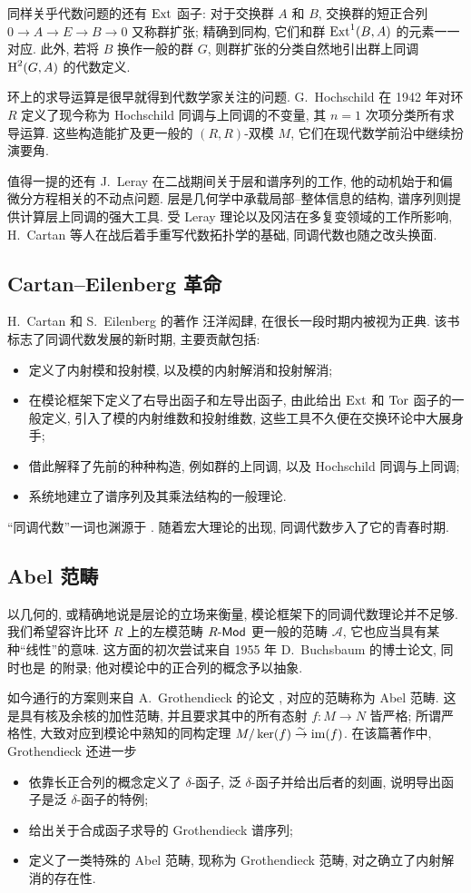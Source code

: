 同样关乎代数问题的还有 $\operatorname{Ext}$ 函子: 对于交换群 $A$ 和 $B$, 交换群的短正合列 $0 \to A \to E \to B \to 0$ 又称群扩张; 精确到同构, 它们和群 $\operatorname{Ext}^1(B, A)$ 的元素一一对应. 此外, 若将 $B$ 换作一般的群 $G$, 则群扩张的分类自然地引出群上同调 $\operatorname{H}^2(G, A)$ 的代数定义.

环上的求导运算是很早就得到代数学家关注的问题. G.\ Hochschild 在 1942 年对环 $R$ 定义了现今称为 Hochschild 同调与上同调的不变量, 其 $n=1$ 次项分类所有求导运算. 这些构造能扩及更一般的 $(R, R)$-双模 $M$, 它们在现代数学前沿中继续扮演要角.

值得一提的还有 J.\ Leray 在二战期间关于层和谱序列的工作, 他的动机始于和偏微分方程相关的不动点问题. 层是几何学中承载局部--整体信息的结构, 谱序列则提供计算层上同调的强大工具. 受 Leray 理论以及冈洁在多复变领域的工作所影响, H.\ Cartan 等人在战后着手重写代数拓扑学的基础, 同调代数也随之改头换面.

\subsection*{Cartan--Eilenberg 革命}
H.\ Cartan 和 S.\ Eilenberg 的著作 \cite{CE56} 汪洋闳肆, 在很长一段时期内被视为正典. 该书标志了同调代数发展的新时期, 主要贡献包括:
\begin{itemize}
	\item 定义了内射模和投射模, 以及模的内射解消和投射解消;
	\item 在模论框架下定义了右导出函子和左导出函子, 由此给出 $\operatorname{Ext}$ 和 $\operatorname{Tor}$ 函子的一般定义, 引入了模的内射维数和投射维数, 这些工具不久便在交换环论中大展身手;
	\item 借此解释了先前的种种构造, 例如群的上同调, 以及 Hochschild 同调与上同调;
	\item 系统地建立了谱序列及其乘法结构的一般理论.
\end{itemize}

``同调代数''一词也渊源于 \cite{CE56}. 随着宏大理论的出现, 同调代数步入了它的青春时期.

\subsection*{Abel 范畴}
以几何的, 或精确地说是层论的立场来衡量, 模论框架下的同调代数理论并不足够. 我们希望容许比环 $R$ 上的左模范畴 $R\text{-}\mathsf{Mod}$ 更一般的范畴 $\mathcal{A}$, 它也应当具有某种``线性''的意味. 这方面的初次尝试来自 1955 年 D.\ Buchsbaum 的博士论文, 同时也是 \cite{CE56} 的附录; 他对模论中的正合列的概念予以抽象. 

如今通行的方案则来自 A.\ Grothendieck 的论文 \cite{Gr57}, 对应的范畴称为 Abel 范畴. 这是具有核及余核的加性范畴, 并且要求其中的所有态射 $f: M \to N$ 皆严格; 所谓严格性, 大致对应到模论中熟知的同构定理 $M/\operatorname{ker}(f) \stackrel{\sim}{\rightarrow} \operatorname{im}(f)$. 在该篇著作中, Grothendieck 还进一步
\begin{itemize}
	\item 依靠长正合列的概念定义了 $\delta$-函子, 泛 $\delta$-函子并给出后者的刻画, 说明导出函子是泛 $\delta$-函子的特例;
	\item 给出关于合成函子求导的 Grothendieck 谱序列;
	\item 定义了一类特殊的 Abel 范畴, 现称为 Grothendieck 范畴, 对之确立了内射解消的存在性.
\end{itemize}

